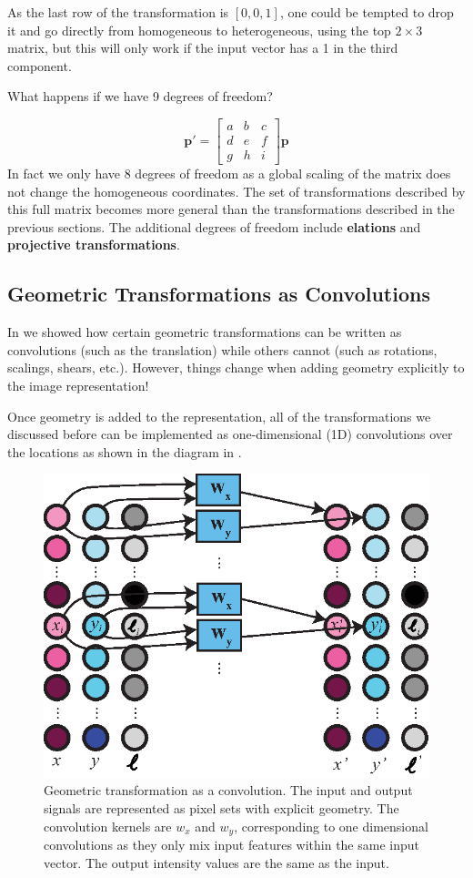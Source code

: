 As the last row of the transformation is $[0,0,1]$, one could be tempted to drop it and go directly from homogeneous to heterogeneous, using the top $2 \times 3$ matrix, but this will only work if the input vector has a 1 in the third component. 

What happens if we have 9 degrees of freedom?

\begin{equation}
    \mathbf{p}' = 
    \begin{bmatrix}
    a & b & c \\
    d & e & f \\
    g & h & i
    \end{bmatrix}
    \mathbf{p}
\end{equation}
In fact we only have 8 degrees of freedom as a global scaling of the matrix does not change the homogeneous coordinates. The set of transformations described by this full matrix becomes more general than the transformations described in the previous sections. The additional degrees of freedom include {\bf elations} and {\bf projective transformations}. 

\subsection{Geometric Transformations as Convolutions}

In \chap{\ref{chapter:linear_image_filtering}} we showed how certain geometric transformations can be written as convolutions (such as the translation) while others cannot (such as rotations, scalings, shears, etc.). However, things change when adding geometry explicitly to the image representation! 

Once geometry is added to the representation, all of the transformations we discussed before can be implemented as one-dimensional (1D) convolutions over the locations as shown in the diagram in \fig{\ref{fig:rotation_as_convolution}}. 


\begin{figure}[ht]
\centerline{
\includegraphics[width=.6\linewidth]{figures/imaging_geometry/rotation_as_convolution.eps}
}
\caption{Geometric transformation as a convolution. The input and output signals are represented as pixel sets with explicit geometry. The convolution kernels are $w_x$ and $w_y$, corresponding to one dimensional convolutions as they only mix input features within the same input vector. The output intensity values are the same as the input.}
\label{fig:rotation_as_convolution}
\end{figure}

